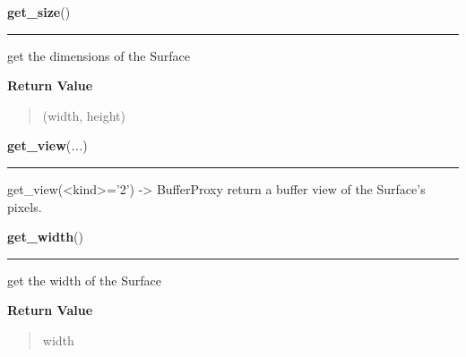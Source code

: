 \hspace{.8\funcindent}\begin{boxedminipage}{\funcwidth}

    \raggedright \textbf{get\_size}()

    \vspace{-1.5ex}

    \rule{\textwidth}{0.5\fboxrule}
\setlength{\parskip}{2ex}
    get the dimensions of the Surface

\setlength{\parskip}{1ex}
      \textbf{Return Value}
    \vspace{-1ex}

      \begin{quote}
      (width, height)

      \end{quote}

    \end{boxedminipage}

    \label{pygame:Surface:get_view}

    \vspace{0.5ex}

\hspace{.8\funcindent}\begin{boxedminipage}{\funcwidth}

    \raggedright \textbf{get\_view}(\textit{...})

    \vspace{-1.5ex}

    \rule{\textwidth}{0.5\fboxrule}
\setlength{\parskip}{2ex}
    get\_view({\textless}kind{\textgreater}='2') -{\textgreater} 
    BufferProxy return a buffer view of the Surface's pixels.

\setlength{\parskip}{1ex}
    \end{boxedminipage}

    \label{pygame:Surface:get_width}

    \vspace{0.5ex}

\hspace{.8\funcindent}\begin{boxedminipage}{\funcwidth}

    \raggedright \textbf{get\_width}()

    \vspace{-1.5ex}

    \rule{\textwidth}{0.5\fboxrule}
\setlength{\parskip}{2ex}
    get the width of the Surface

\setlength{\parskip}{1ex}
      \textbf{Return Value}
    \vspace{-1ex}

      \begin{quote}
      width

      \end{quote}

    \end{boxedminipage}

